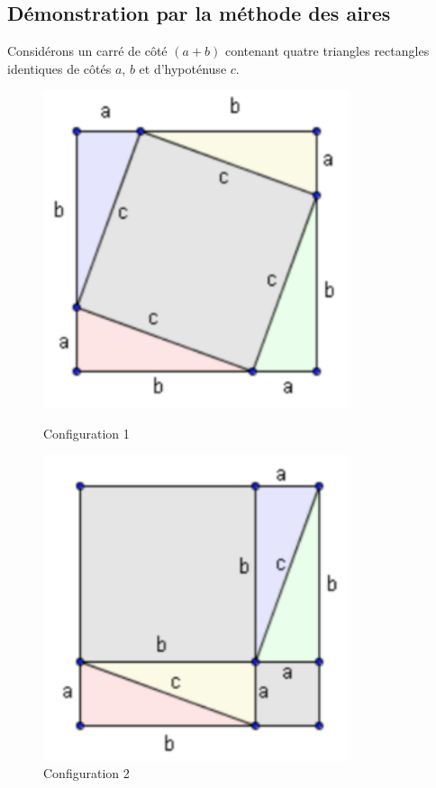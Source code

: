 \subsection{Démonstration par la méthode des aires}

Considérons un carré de côté $(a + b)$ contenant quatre triangles rectangles identiques de côtés $a$, $b$ et d'hypoténuse $c$.

\begin{figure}[H]
\centering
\begin{minipage}{0.45\textwidth}
    \centering
    \includegraphics[width=0.8\textwidth]{chapitres/figures/chapitre_02_pythagore/fig_demo_pythagore_config_1.png}
    \caption{Configuration 1}
    \label{fig:config1}
\end{minipage}
\hfill
\begin{minipage}{0.45\textwidth}
    \centering
    \includegraphics[width=0.8\textwidth]{chapitres/figures/chapitre_02_pythagore/fig_demo_pythagore_config_2.png}
    \caption{Configuration 2}
    \label{fig:config2}
\end{minipage}
\end{figure}

